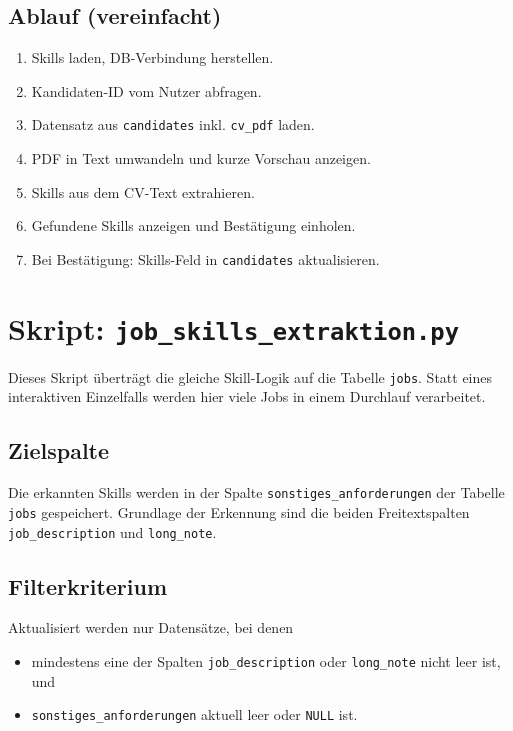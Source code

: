 \documentclass[12pt,a4paper]{article}
\begin{document}
\subsection{Ablauf (vereinfacht)}
\begin{enumerate}
    \item Skills laden, DB-Verbindung herstellen.
    \item Kandidaten-ID vom Nutzer abfragen.
    \item Datensatz aus \texttt{candidates} inkl. \texttt{cv\_pdf} laden.
    \item PDF in Text umwandeln und kurze Vorschau anzeigen.
    \item Skills aus dem CV-Text extrahieren.
    \item Gefundene Skills anzeigen und Bestätigung einholen.
    \item Bei Bestätigung: Skills-Feld in \texttt{candidates} aktualisieren.
\end{enumerate}

\section{Skript: \texttt{job\_skills\_extraktion.py}}

Dieses Skript überträgt die gleiche Skill-Logik auf die Tabelle \texttt{jobs}. Statt eines
interaktiven Einzelfalls werden hier viele Jobs in einem Durchlauf verarbeitet.

\subsection{Zielspalte}

Die erkannten Skills werden in der Spalte \texttt{sonstiges\_anforderungen} der Tabelle
\texttt{jobs} gespeichert. Grundlage der Erkennung sind die beiden Freitextspalten
\texttt{job\_description} und \texttt{long\_note}.

\subsection{Filterkriterium}

Aktualisiert werden nur Datensätze, bei denen
\begin{itemize}
    \item mindestens eine der Spalten \texttt{job\_description} oder \texttt{long\_note}
          nicht leer ist, und
    \item \texttt{sonstiges\_anforderungen} aktuell leer oder \texttt{NULL} ist.
\end{itemize}
\end{document}
